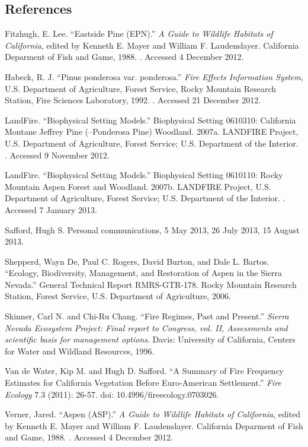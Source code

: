 \subsection*{References}
\begin{hangparas}{.25in}{1} 
Fitzhugh, E. Lee. ``Eastside Pine (EPN).'' \emph{A Guide to Wildlife Habitats of California}, edited by Kenneth E. Mayer and William F. Laudenslayer. California Deparment of Fish and Game, 1988. . Accessed 4 December 2012.

Habeck, R. J. ``Pinus ponderosa var. ponderosa.'' \emph{Fire Effects Information System}, U.S. Department of Agriculture, Forest Service,  Rocky Mountain Research Station, Fire Sciences Laboratory, 1992. . Accessed 21 December 2012.

LandFire. ``Biophysical Setting Models.'' Biophysical Setting 0610310: California Montane Jeffrey Pine (–Ponderosa Pine) Woodland. 2007a. LANDFIRE Project, U.S. Department of Agriculture, Forest Service; U.S. Department of the Interior. . Accessed 9 November 2012.

LandFire. ``Biophysical Setting Models.'' Biophysical Setting 0610110: Rocky Mountain Aspen Forest and Woodland. 2007b. LANDFIRE Project, U.S. Department of Agriculture, Forest Service; U.S. Department of the Interior. . Accessed 7 January 2013.

Safford, Hugh S. Personal communications, 5 May 2013, 26 July 2013, 15 August 2013.

Shepperd, Wayn De, Paul C. Rogers, David Burton, and Dale L. Bartos. ``Ecology, Biodiversity, Management, and Restoration of Aspen in the Sierra Nevada.'' General Technical Report RMRS-GTR-178. Rocky Mountain Research Station, Forest Service, U.S. Department of Agriculture, 2006.

Skinner, Carl N. and Chi-Ru Chang. ``Fire Regimes, Past and Present.'' \emph{Sierra Nevada Ecosystem Project: Final report to Congress, vol. II, Assessments and scientific basis for management options}. Davis: University of California, Centers for Water and Wildland Resources, 1996.

Van de Water, Kip M. and Hugh D. Safford. ``A Summary of Fire Frequency Estimates for California Vegetation Before Euro-American Settlement.'' \emph{Fire Ecology} 7.3 (2011): 26-57. doi: 10.4996/fireecology.0703026.

Verner, Jared. ``Aspen (ASP).'' \emph{A Guide to Wildlife Habitats of California}, edited by Kenneth E. Mayer and William F. Laudenslayer. California Deparment of Fish and Game, 1988. . Accessed 4 December 2012.

\end{hangparas}

